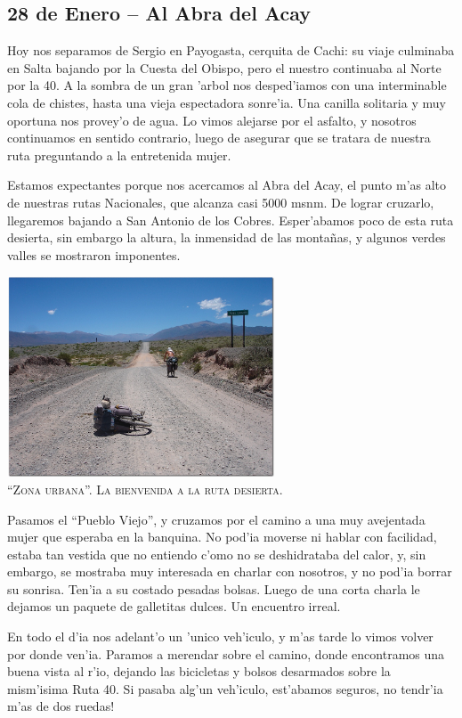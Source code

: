 \subsection*{28 de Enero -- Al Abra del Acay}

Hoy nos separamos de Sergio en Payogasta, cerquita de Cachi: su viaje culminaba
en Salta bajando por la Cuesta del Obispo, pero el nuestro continuaba al Norte
por la 40. A la sombra de un gran 'arbol nos desped'iamos con una interminable
cola de chistes, hasta una vieja espectadora sonre'ia. Una canilla solitaria y
muy oportuna nos provey'o de agua. Lo vimos alejarse por el asfalto, y nosotros
continuamos en sentido contrario, luego de asegurar que se tratara de nuestra
ruta preguntando a la entretenida mujer.

Estamos expectantes porque nos acercamos al Abra del Acay, el punto m'as alto de
nuestras rutas Nacionales, que alcanza casi 5000 msnm. De lograr cruzarlo,
llegaremos bajando a San Antonio de los Cobres. Esper'abamos poco de esta ruta
desierta, sin embargo la altura, la inmensidad de las monta\~nas, y algunos
verdes valles se mostraron imponentes.

\begin{center} \includegraphics[width=300px]{images/DSC0311.jpg}
\textsc{\\``Zona urbana''. La bienvenida a la ruta desierta.} \end{center}

Pasamos el ``Pueblo Viejo'', y cruzamos por el camino a una muy avejentada mujer
que esperaba en la banquina. No pod'ia moverse ni hablar con facilidad, estaba
tan vestida que no entiendo c'omo no se deshidrataba del calor, y, sin embargo,
se mostraba muy interesada en charlar con nosotros, y no pod'ia borrar su
sonrisa. Ten'ia a su costado pesadas bolsas. Luego de una corta charla le
dejamos un paquete de galletitas dulces. Un encuentro irreal.

En todo el d'ia nos adelant'o un 'unico veh'iculo, y m'as tarde lo vimos volver
por donde ven'ia. Paramos a merendar sobre el camino, donde encontramos una
buena vista al r'io, dejando las bicicletas y bolsos desarmados sobre la
mism'isima Ruta 40. \textexclamdown Si pasaba alg'un veh'iculo, est'abamos
seguros, no tendr'ia m'as de dos ruedas!


